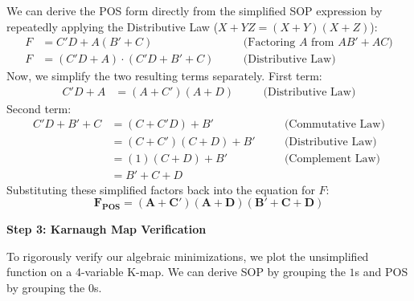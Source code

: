 \documentclass[12pt,a3paper]{article}
\begin{document}
\begin{enumerate}
\begin{tcolorbox}[enhanced,breakable,ansbox,colback=cA!4,colframe=cA,boxrule=0.8pt,arc=5pt,title={\textbf{Answer}},fonttitle=\bfseries\color{white},colbacktitle=cA]
We can derive the POS form directly from the simplified SOP expression by repeatedly applying the Distributive Law ($X + YZ = (X + Y)(X + Z)$):
\begin{align*}
F &= C'D + A(B' + C) \quad &&\text{(Factoring } A \text{ from } AB' + AC \text{)} \\
F &= (C'D + A) \cdot (C'D + B' + C) \quad &&\text{(Distributive Law)}
\end{align*}
Now, we simplify the two resulting terms separately. 
\newline First term:
\begin{align*}
C'D + A &= (A + C')(A + D) \quad &&\text{(Distributive Law)}
\end{align*}
Second term:
\begin{align*}
C'D + B' + C &= (C + C'D) + B' \quad &&\text{(Commutative Law)} \\
&= (C + C')(C + D) + B' \quad &&\text{(Distributive Law)} \\
&= (1)(C + D) + B' \quad &&\text{(Complement Law)} \\
&= B' + C + D
\end{align*}
Substituting these simplified factors back into the equation for $F$:
\[ \mathbf{F_{POS} = (A + C')(A + D)(B' + C + D)} \]

\vspace{0.3cm}
\textbf{Step 3: Karnaugh Map Verification}

To rigorously verify our algebraic minimizations, we plot the unsimplified function on a 4-variable K-map. We can derive SOP by grouping the $1$s and POS by grouping the $0$s.

\vspace{0.4cm}
\begin{center}
\end{center}
\end{tcolorbox}
\end{enumerate}
\end{document}
